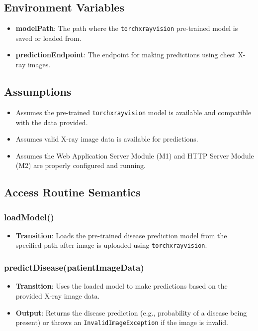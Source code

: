 \documentclass[12pt, titlepage]{article}
\begin{document}
\subsection{Environment Variables}
\begin{itemize}
    \item \textbf{modelPath}: The path where the \texttt{torchxrayvision} pre-trained model is saved or loaded from.
    \item \textbf{predictionEndpoint}: The endpoint for making predictions using chest X-ray images.
\end{itemize}

\subsection{Assumptions}
\begin{itemize}
    \item Assumes the pre-trained \texttt{torchxrayvision} model is available and compatible with the data provided.
    \item Assumes valid X-ray image data is available for predictions.
    \item Assumes the Web Application Server Module (M1) and HTTP Server Module (M2) are properly configured and running.
\end{itemize}

\subsection{Access Routine Semantics}
\subsubsection{loadModel()}
\begin{itemize}
    \item \textbf{Transition}: Loads the pre-trained disease prediction model from the specified path after image is uploaded using \texttt{torchxrayvision}.
\end{itemize}

\subsubsection{predictDisease(patientImageData)}
\begin{itemize}
    \item \textbf{Transition}: Uses the loaded model to make predictions based on the provided X-ray image data.
    \item \textbf{Output}: Returns the disease prediction (e.g., probability of a disease being present) or throws an \texttt{InvalidImageException} if the image is invalid.
\end{itemize}
\end{document}
